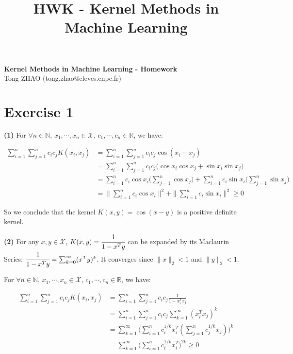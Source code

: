\documentclass[11pt]{article}
\begin{document}
    
    \title{HWK - Kernel Methods in Machine Learning}
    
    \thispagestyle{empty}
    
    \begin{center}
    {\LARGE \bf Kernel Methods in Machine Learning - Homework}\\
    \vspace{1em}
    {\large Tong ZHAO (tong.zhao@eleves.enpc.fr)}\\
    \end{center}

    \section*{Exercise 1}

    \textbf{(1)} For $\forall n \in \mathbb{N}$, $x_1, \cdots, x_n \in \mathcal{X}$, $c_1, \cdots, c_n \in \mathbb{R}$, we have:

    \vspace{-4em}
    \begin{align*}
      \sum_{i=1}^n \sum_{j=1}^n c_i c_j K(x_i, x_j) &= \sum_{i=1}^n \sum_{j=1}^n c_i c_j \cos(x_i - x_j) \\
      &= \sum_{i=1}^n \sum_{j=1}^n c_i c_j \Big ( \cos x_i \cos x_j + \sin x_i \sin x_j \Big ) \\
      &= \sum_{i=1}^n c_i \cos x_i \Big ( \sum_{j=1}^n \cos x_j \Big ) + \sum_{i=1}^n c_i \sin x_i \Big ( \sum_{j=1}^n \sin x_j \Big ) \\
      &= \|\sum_{i=1}^n c_i \cos x_i\|^2  + \|\sum_{i=1}^n c_i \sin x_i\|^2 \ge 0
    \end{align*}
    \vspace{-4em}

    So we conclude that the kernel $K(x, y) = \cos(x-y)$ is a positive definite kernel.

    \textbf{(2)} For any $x, y \in \mathcal{X}$, $K(x,y) = \cfrac{1}{1-x^Ty}$ can be expanded by its Maclaurin Series: $\cfrac{1}{1-x^Ty} = \sum_{k=0}^\infty (x^Ty)^k$.
    It converges since $\|x\|_2 < 1$ and $\|y\|_2 < 1$.

    For $\forall n \in \mathbb{N}$, $x_1, \cdots, x_n \in \mathcal{X}$, $c_1, \cdots, c_n \in \mathbb{R}$, we have:
    
    \vspace{-4em}
    \begin{align*}
      \sum_{i=1}^n \sum_{j=1}^n c_i c_j K(x_i, x_j) &= \sum_{i=1}^n \sum_{j=1}^n c_i c_j \frac{1}{1-x_i^T x_j} \\
      &= \sum_{i=1}^n \sum_{j=1}^n c_i c_j \sum_{k=1}^\infty (x_i^T x_j)^k \\
      &= \sum_{k=1}^\infty \Big (\sum_{i=1}^n c_i^{1/k} x_i^T (\sum_{j=1}^n c_j^{1/k} x_j) \Big )^k \\
      &= \sum_{k=1}^\infty \Big (\sum_{i=1}^n c_i^{1/k} x_i^T \Big )^{2k} \ge 0
    \end{align*}
    \vspace{-4em}
\end{document}
